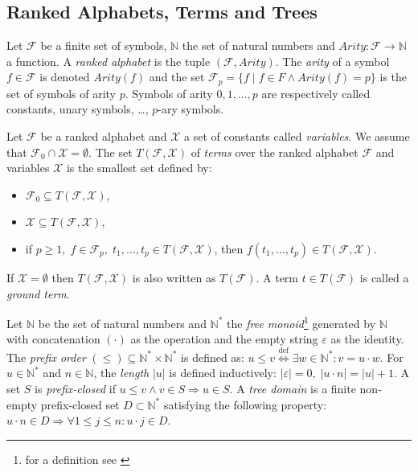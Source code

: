 \subsection{Ranked Alphabets, Terms and Trees}
\begin{defn}
Let $\mathcal{F}$ be a finite set of symbols, $\mathbb{N}$ the set of natural numbers and $Arity: \mathcal{F} \rightarrow \mathbb{N}$ a function. A \emph{ranked alphabet} is the tuple $(\mathcal{F}, Arity)$. The \emph{arity} of a symbol $f \in \mathcal{F}$ is denoted $Arity(f)$ and the set $\mathcal{F}_p = \{f \; | \; f \in F \wedge Arity(f) = p\}$ is the set of symbols of arity $p$. Symbols of arity $0, 1, \dots, p$ are respectively called constants, unary symbols, \dots, $p$-ary symbols.
\end{defn}

\begin{defn}
Let $\mathcal{F}$ be a ranked alphabet and $\mathcal{X}$ a set of constants called \emph{variables}. We assume that $\mathcal{F}_0 \cap \mathcal{X} = \emptyset$. The set $T(\mathcal{F}, \mathcal{X})$ of \emph{terms} over the ranked alphabet $\mathcal{F}$ and variables $\mathcal{X}$ is the smallest set defined by:
\begin{itemize}
    \item $\mathcal{F}_0 \subseteq T(\mathcal{F}, \mathcal{X})$,
    \item $\mathcal{X} \subseteq T(\mathcal{F}, \mathcal{X})$,
    \item if $p \geq 1, \; f \in \mathcal{F}_p, \; t_1,\dots, t_p \in T(\mathcal{F}, \mathcal{X})$, then $f(t_1,\dots, t_p) \in T(\mathcal{F}, \mathcal{X})$.
\end{itemize}
If $\mathcal{X} = \emptyset$ then $T(\mathcal{F}, \mathcal{X})$ is also written as $T(\mathcal{F})$. A term $t \in T(\mathcal{F})$ is called a \emph{ground term}.
\end{defn}

\begin{defn}
Let $\mathbb{N}$ be the set of natural numbers and $\mathbb{N}^*$ the \emph{free monoid}\footnote{for a definition see \cite{Lothaire83}} generated by $\mathbb{N}$ with concatenation $(\cdot)$ as the operation and the empty string $\varepsilon$ as the identity. The \emph{prefix order} $(\leq) \subseteq \mathbb{N}^* \times \mathbb{N}^*$ is defined as: $u \leq v \overset{\text{def}}{\Longleftrightarrow} \exists w \in \mathbb{N}^*: v = u \cdot w$. For $u \in \mathbb{N}^*$ and $n \in \mathbb{N}$, the \emph{length} $|u|$ is defined inductively: $|\varepsilon| = 0, \; |u \cdot n| = |u| + 1$. A set $S$ is \emph{prefix-closed} if $u \leq v \wedge v \in S \Rightarrow u \in S$. A \emph{tree domain} is a finite non-empty prefix-closed set $D \subset \mathbb{N}^*$ satisfying the following property: $u \cdot n \in D \Rightarrow \forall 1 \leq j \leq n: u \cdot j \in D$.
\end{defn}

